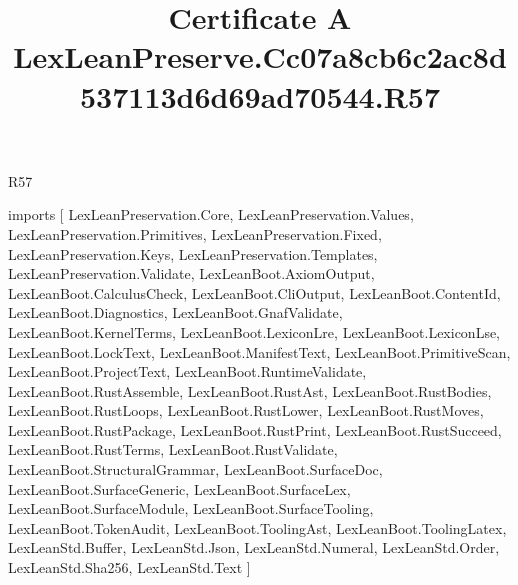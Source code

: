 \begin{lexlean}{R57}
\title{Certificate A LexLeanPreserve.Cc07a8cb6c2ac8d537113d6d69ad70544.R57}
\begin{coremodule}
imports [
  LexLeanPreservation.Core,
  LexLeanPreservation.Values,
  LexLeanPreservation.Primitives,
  LexLeanPreservation.Fixed,
  LexLeanPreservation.Keys,
  LexLeanPreservation.Templates,
  LexLeanPreservation.Validate,
  LexLeanBoot.AxiomOutput,
  LexLeanBoot.CalculusCheck,
  LexLeanBoot.CliOutput,
  LexLeanBoot.ContentId,
  LexLeanBoot.Diagnostics,
  LexLeanBoot.GnafValidate,
  LexLeanBoot.KernelTerms,
  LexLeanBoot.LexiconLre,
  LexLeanBoot.LexiconLse,
  LexLeanBoot.LockText,
  LexLeanBoot.ManifestText,
  LexLeanBoot.PrimitiveScan,
  LexLeanBoot.ProjectText,
  LexLeanBoot.RuntimeValidate,
  LexLeanBoot.RustAssemble,
  LexLeanBoot.RustAst,
  LexLeanBoot.RustBodies,
  LexLeanBoot.RustLoops,
  LexLeanBoot.RustLower,
  LexLeanBoot.RustMoves,
  LexLeanBoot.RustPackage,
  LexLeanBoot.RustPrint,
  LexLeanBoot.RustSucceed,
  LexLeanBoot.RustTerms,
  LexLeanBoot.RustValidate,
  LexLeanBoot.StructuralGrammar,
  LexLeanBoot.SurfaceDoc,
  LexLeanBoot.SurfaceGeneric,
  LexLeanBoot.SurfaceLex,
  LexLeanBoot.SurfaceModule,
  LexLeanBoot.SurfaceTooling,
  LexLeanBoot.TokenAudit,
  LexLeanBoot.ToolingAst,
  LexLeanBoot.ToolingLatex,
  LexLeanStd.Buffer,
  LexLeanStd.Json,
  LexLeanStd.Numeral,
  LexLeanStd.Order,
  LexLeanStd.Sha256,
  LexLeanStd.Text
]


\end{coremodule}
\end{lexlean}
